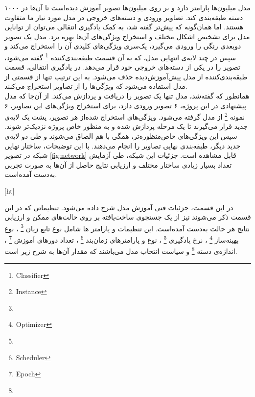 مدل  میلیون‌ها پارامتر دارد و بر روی میلیون‌ها تصویر آموزش دیده‌است تا آن‌ها در ۱۰۰۰ دسته طبقه‌بندی کند.
تصاویر ورودی و دسته‌های خروجی در مدل مورد نیاز ما متفاوت هستند. اما
همان‌گونه که پیش‌تر گفته شد، به کمک یادگیری انتقالی می‌توان از توانایی مدل  برای تشخیص اشکال مختلف و استخراج ویژگی‌های آن‌ها بهره برد.
مدل  یک تصویر دو‌بعدی رنگی را ورودی می‌گیرد، یک‌سری ویژگی‌های کلیدی آن را استخراج می‌کند و 
سپس در چند لایه‌ی انتهایی مدل، که به آن قسمت طبقه‌بندی‌کننده
\footnote{Classifier}
گفته می‌شود، تصویر را در یکی از دسته‌های خروجی خود قرار می‌دهد.
در یادگیری انتقالی، قسمت طبقه‌بندی‌کننده از مدل پیش‌آموزش‌دیده حذف می‌شود.
به این ترتیب تنها از قسمتی از مدل استفاده می‌شود که ویژگی‌ها را از تصاویر استخراج می‌کنند.\\

همانطور که گفته‌شد، مدل  تنها یک تصویر را دریافت و پردازش می‌کند.
از آن‌جا که مدل پیشنهادی در این پروژه، ۶ تصویر ورودی دارد، برای استخراج ویژگی‌های این تصاویر، ۶ نمونه
\footnote{Instance}
از مدل  گرفته می‌شود.
ویژگی‌های استخراج شده‌از هر تصویر، پشت یک لایه‌ی 
جدید قرار می‌گیرند تا یک مرحله پردازش شده و به منظور خاص پروژه نزدیک‌تر شوند.
سپس این ویژگی‌های خاص‌منظوره‌تر، همگی با هم الصاق می‌شوند و طی دو لایه‌ی جدید دیگر، طبقه‌بندی نهایی تصاویر را انجام می‌دهند.
با این توضیحات، ساختار نهایی شبکه در تصویر \ref{fig:network}
قابل مشاهده است.
جزئیات این شبکه، 
طی آزمایش تعداد بسیار زیادی ساختار مختلف و ارزیابی نتایج حاصل از آن‌ها به صورت تجربی به‌دست آمده‌است.


[ht]


در این قسمت، جزئیات فنی آموزش مدل شرح داده می‌شود.
تنظیماتی که در این قسمت ذکر می‌شوند نیز از یک جستجوی ساخت‌یافته بر روی حالت‌های ممکن و ارزیابی نتایج هر حالت به‌دست آمده‌است.
این تنظیمات و پارامتر ها شامل 
نوع تابع زیان
\footnote{}
،
نوع بهینه‌ساز
\footnote{Optimizer}
، نرخ یادگیری
\footnote{}
،
نوع و پارامتر‌های زمان‌بند
\footnote{Scheduler}
،
تعداد دور‌های آموزش
\footnote{Epoch}
، 
اندازه‌ی دسته
\footnote{}
و 
سیاست انتخاب مدل می‌باشند که مقدار آن‌ها به شرح زیر است.\\

